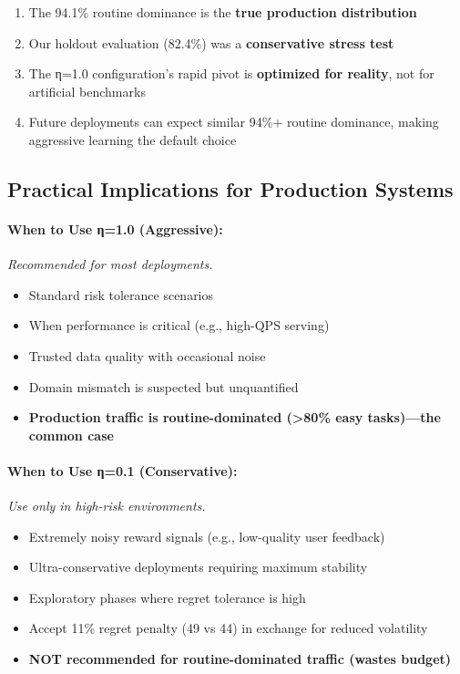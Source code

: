 \begin{center}
\begin{enumerate}[leftmargin=*,nosep]
    \item The 94.1\% routine dominance is the \textbf{true production distribution}
    \item Our holdout evaluation (82.4\%) was a \textbf{conservative stress test}
    \item The η=1.0 configuration's rapid pivot is \textbf{optimized for reality}, not for artificial benchmarks
    \item Future deployments can expect similar 94\%+ routine dominance, making aggressive learning the default choice
\end{enumerate}

\subsection{Practical Implications for Production Systems}

\paragraph{When to Use η=1.0 (Aggressive):} \textit{Recommended for most deployments.}
\begin{itemize}[leftmargin=*,nosep]
    \item Standard risk tolerance scenarios
    \item When performance is critical (e.g., high-QPS serving)
    \item Trusted data quality with occasional noise
    \item Domain mismatch is suspected but unquantified
    \item \textbf{Production traffic is routine-dominated (>80\% easy tasks)—the common case}
\end{itemize}

\paragraph{When to Use η=0.1 (Conservative):} \textit{Use only in high-risk environments.}
\begin{itemize}[leftmargin=*,nosep]
    \item Extremely noisy reward signals (e.g., low-quality user feedback)
    \item Ultra-conservative deployments requiring maximum stability
    \item Exploratory phases where regret tolerance is high
    \item Accept 11\% regret penalty (49 vs 44) in exchange for reduced volatility
    \item \textbf{NOT recommended for routine-dominated traffic (wastes budget)}
\end{itemize}


\end{center}
